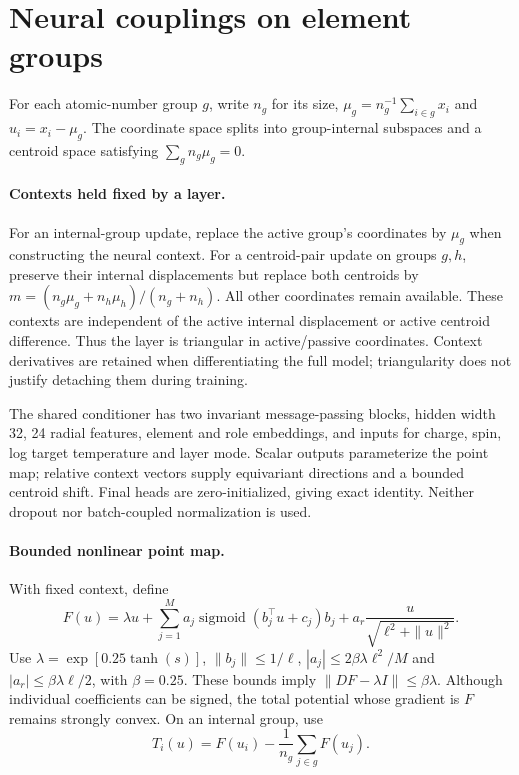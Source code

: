 \section{Neural couplings on element groups}
For each atomic-number group $g$, write $n_g$ for its size,
$\mu_g=n_g^{-1}\sum_{i\in g}x_i$ and $u_i=x_i-\mu_g$. The coordinate space
splits into group-internal subspaces and a centroid space satisfying
$\sum_g n_g\mu_g=0$.

\paragraph{Contexts held fixed by a layer.}
For an internal-group update, replace the active group's coordinates by
$\mu_g$ when constructing the neural context. For a centroid-pair update
on groups $g,h$, preserve their internal displacements but replace both
centroids by $m=(n_g\mu_g+n_h\mu_h)/(n_g+n_h)$. All other coordinates remain
available. These contexts are independent of the active internal displacement
or active centroid difference. Thus the layer is triangular in active/passive
coordinates. Context derivatives are retained when differentiating the full
model; triangularity does not justify detaching them during training.

The shared conditioner has two invariant message-passing blocks, hidden width 32,
24 radial features, element and role embeddings, and inputs for charge, spin,
log target temperature and layer mode. Scalar outputs parameterize the point
map; relative context vectors supply equivariant directions and a bounded
centroid shift. Final heads are zero-initialized, giving exact identity.
Neither dropout nor batch-coupled normalization is used.

\paragraph{Bounded nonlinear point map.}
With fixed context, define
\begin{equation}
 F(u)=\lambda u+\sum_{j=1}^{M}a_j\operatorname{sigmoid}(b_j^\top u+c_j)b_j
       +a_r\frac{u}{\sqrt{\ell^2+\|u\|^2}}.
 \label{eq:point-map}
\end{equation}
Use $\lambda=\exp[0.25\tanh(s)]$, $\|b_j\|\leq1/\ell$,
$|a_j|\leq2\beta\lambda\ell^2/M$ and
$|a_r|\leq\beta\lambda\ell/2$, with $\beta = 0.25$.
These bounds imply $\|DF-\lambda I\|\leq\beta\lambda$.
Although individual coefficients can be signed, the total potential whose
gradient is $F$ remains strongly convex. On an internal group, use
\begin{equation}
 T_i(u)=F(u_i)-\frac1{n_g}\sum_{j\in g}F(u_j).
 \label{eq:centered-map}
\end{equation}

